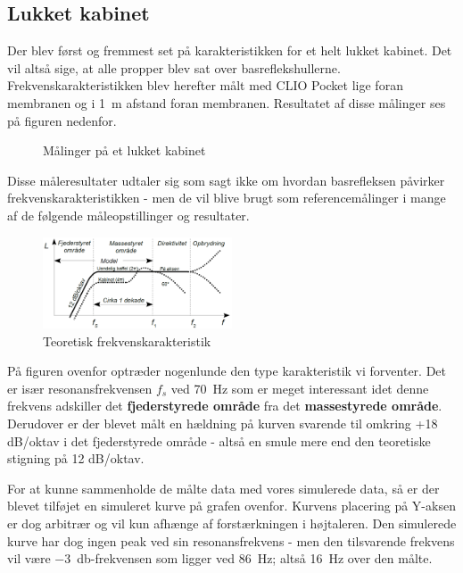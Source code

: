 \newpage
\subsection{Lukket kabinet}
Der blev først og fremmest set på karakteristikken for et helt lukket kabinet. Det vil altså sige, at alle propper blev sat over basreflekshullerne. Frekvenskarakteristikken blev herefter målt med CLIO Pocket lige foran membranen og i \SI{1}{\meter} afstand foran membranen. Resultatet af disse målinger ses på figuren nedenfor.
\begin{figure}[H]
	\centering
	\vspace{-12pt}
	\caption{Målinger på et lukket kabinet}
\end{figure}

Disse måleresultater udtaler sig som sagt ikke om hvordan basrefleksen påvirker frekvenskarakteristikken - men de vil blive brugt som referencemålinger i mange af de følgende måleopstillinger og resultater.

\begin{figure} 
	\vspace{-20pt}
	\begin{center}
		\includegraphics[width=0.5\textwidth]{Billeder/FrekvenskarakteristikTeori}
	\end{center}
	\vspace{-15pt}
	\caption{Teoretisk frekvenskarakteristik}
	\vspace{-20pt}
\end{figure}
På figuren ovenfor optræder nogenlunde den type karakteristik vi forventer. Det er især resonansfrekvensen $f_s$ ved \SI{70}{\hertz} som er meget interessant idet denne frekvens adskiller det \textbf{fjederstyrede område} fra det \textbf{massestyrede område}. Derudover er der blevet målt en hældning på kurven svarende til omkring +18 dB/oktav i det fjederstyrede område - altså en smule mere end den teoretiske stigning på 12 dB/oktav.

\newpage
For at kunne sammenholde de målte data med vores simulerede data, så er der blevet tilføjet en simuleret kurve på grafen ovenfor. Kurvens placering på Y-aksen er dog arbitrær og vil kun afhænge af forstærkningen i højtaleren. Den simulerede kurve har dog ingen peak ved sin resonansfrekvens -  men den tilsvarende frekvens vil være \SI{-3}{\decibel}-frekvensen som ligger ved \SI{86}{\hertz}; altså \SI{16}{\hertz} over den målte.

